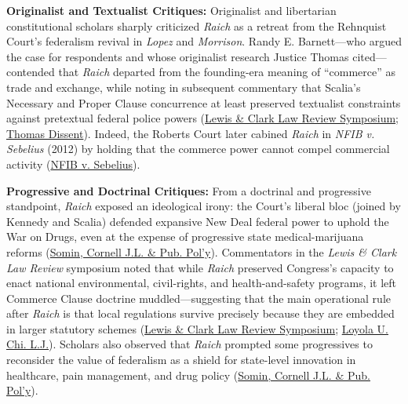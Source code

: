 \documentclass[12pt]{article}
\begin{document}
\textbf{Originalist and Textualist Critiques:} Originalist and libertarian constitutional scholars sharply criticized \textit{Raich} as a retreat from the Rehnquist Court's federalism revival in \textit{Lopez} and \textit{Morrison}. Randy E. Barnett---who argued the case for respondents and whose originalist research Justice Thomas cited---contended that \textit{Raich} departed from the founding-era meaning of ``commerce'' as trade and exchange, while noting in subsequent commentary that Scalia's Necessary and Proper Clause concurrence at least preserved textualist constraints against pretextual federal police powers (\href{https://law.lclark.edu/law_reviews/lewis_and_clark_law_review/past_issues/volume_09/number_4.php}{Lewis \& Clark Law Review Symposium}; \href{https://www.law.cornell.edu/supct/html/03-1454.ZD1.html}{Thomas Dissent}). Indeed, the Roberts Court later cabined \textit{Raich} in \textit{NFIB v. Sebelius} (2012) by holding that the commerce power cannot compel commercial activity (\href{https://supreme.justia.com/cases/federal/us/567/11-393/case.pdf}{NFIB v. Sebelius}).

\textbf{Progressive and Doctrinal Critiques:} From a doctrinal and progressive standpoint, \textit{Raich} exposed an ideological irony: the Court's liberal bloc (joined by Kennedy and Scalia) defended expansive New Deal federal power to uphold the War on Drugs, even at the expense of progressive state medical-marijuana reforms (\href{https://ww3.lawschool.cornell.edu/research/JLPP/upload/Somin-507.pdf}{Somin, Cornell J.L. \& Pub. Pol'y}). Commentators in the \textit{Lewis \& Clark Law Review} symposium noted that while \textit{Raich} preserved Congress's capacity to enact national environmental, civil-rights, and health-and-safety programs, it left Commerce Clause doctrine muddled---suggesting that the main operational rule after \textit{Raich} is that local regulations survive precisely because they are embedded in larger statutory schemes (\href{https://law.lclark.edu/law_reviews/lewis_and_clark_law_review/past_issues/volume_09/number_4.php}{Lewis \& Clark Law Review Symposium}; \href{https://loyola-chicago-law-journal.scholasticahq.com/article/76736-the-future-of-the-federalism-revolution-i-gonzales-v-raich-i-and-the-legacy-of-the-rehnquist-court.pdf}{Loyola U. Chi. L.J.}). Scholars also observed that \textit{Raich} prompted some progressives to reconsider the value of federalism as a shield for state-level innovation in healthcare, pain management, and drug policy (\href{https://ww3.lawschool.cornell.edu/research/JLPP/upload/Somin-507.pdf}{Somin, Cornell J.L. \& Pub. Pol'y}).
\end{document}
